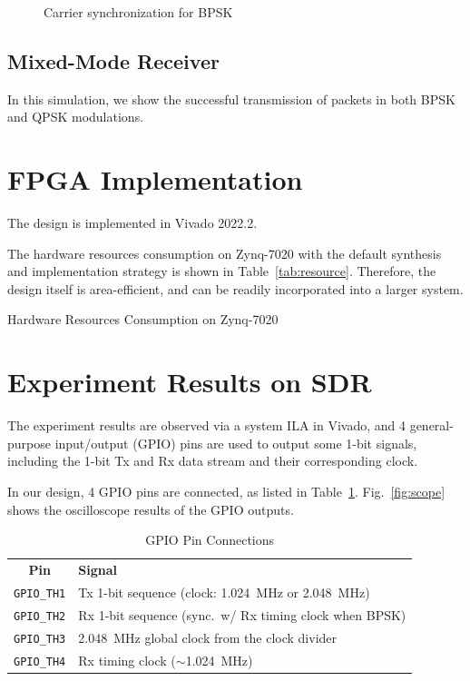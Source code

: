 \documentclass[journal,twoside]{IEEEtran}
\newcommand{\tabvertspace}{\specialrule{0em}{0.08em}{.08em}}
\begin{document}
      \begin{figure}[htbp]
        \centering
        
        \caption{Carrier synchronization for BPSK}
      \end{figure}

    \subsection{Mixed-Mode Receiver}

      In this simulation, we show the successful transmission of packets in both BPSK and QPSK modulations.

  \section{FPGA Implementation}

    The design is implemented in Vivado 2022.2.

    The hardware resources consumption on Zynq-7020 with the default synthesis and implementation strategy is shown in Table~\ref{tab:resource}.
    Therefore, the design itself is area-efficient, and can be readily incorporated into a larger system.
    \begin{table}[htbp]
      \caption{Hardware Resources Consumption on Zynq-7020}
      \label{tab:resource}
    \end{table}

  \section{Experiment Results on SDR}

    The experiment results are observed via a system ILA in Vivado,
    and 4 general-purpose input/output (GPIO) pins are used to output some 1-bit signals,
    including the 1-bit Tx and Rx data stream and their corresponding clock.

    In our design, 4 GPIO pins are connected, as listed in Table~\ref{tab:gpio_pins}.
    Fig.~\ref{fig:scope} shows the oscilloscope results of the GPIO outputs.
    \begin{table}[htbp]
      \caption{GPIO Pin Connections}
      \label{tab:gpio_pins}
      \renewcommand{\arraystretch}{1.2}
      \begin{tabularx}{\linewidth}{cX}
        \toprule\tabvertspace
        \textbf{Pin} & \textbf{Signal} \\
        \tabvertspace\midrule
        \texttt{GPIO\_TH1} & Tx 1-bit sequence (clock: \qty{1.024}{MHz} or \qty{2.048}{MHz}) \\
        \texttt{GPIO\_TH2} & Rx 1-bit sequence (sync.\ w/ Rx timing clock when BPSK) \\
        \texttt{GPIO\_TH3} & \qty{2.048}{MHz} global clock from the clock divider \\
        \texttt{GPIO\_TH4} & Rx timing clock ($\sim$\qty{1.024}{MHz}) \\
        \bottomrule
      \end{tabularx}
    \end{table}
\end{document}
